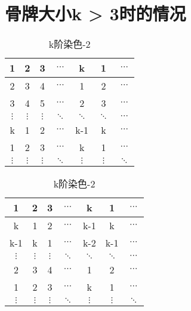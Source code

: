 \section{骨牌大小k > 3时的情况}

\begin{table}[htbp]
	\caption{k阶染色}
	\label{fig:k-order-staining}
	\begin{subtable}{.5\linewidth}
		\centering
		\caption{k阶染色-1}
		\begin{tabular}{|c|c|c|c|c|c|c|}
			\hline
			1        & 2        & 3        & $\cdots$ & k        & 1        & $\cdots$ \\
			\hline
			2        & 3        & 4        & $\cdots$ & 1        & 2        & $\cdots$ \\
			\hline
			3        & 4        & 5        & $\cdots$ & 2        & 3        & $\cdots$ \\
			\hline
			$\vdots$ & $\vdots$ & $\vdots$ & $\ddots$ & $\ddots$ & $\ddots$ & $\cdots$ \\
			\hline
			k        & 1        & 2        & $\cdots$ & k-1      & k        & $\cdots$ \\
			\hline
			1        & 2        & 3        & $\cdots$ & k        & 1        & $\cdots$ \\
			\hline
			$\vdots$ & $\vdots$ & $\vdots$ & $\ddots$ & $\vdots$ & $\vdots$ & $\ddots$ \\
			\hline
		\end{tabular}
		\label{fig:k-order-staining-1}
	\end{subtable}%
	\begin{subtable}{.5\linewidth}
		\centering
		\caption{k阶染色-2}
		\begin{tabular}{|c|c|c|c|c|c|c|}
			\hline
			1        & 2        & 3        & $\cdots$ & k        & 1        & $\cdots$ \\
			\hline
			k        & 1        & 2        & $\cdots$ & k-1      & k        & $\cdots$ \\
			\hline
			k-1      & k        & 1        & $\cdots$ & k-2      & k-1      & $\cdots$ \\
			\hline
			$\vdots$ & $\vdots$ & $\vdots$ & $\ddots$ & $\ddots$ & $\ddots$ & $\cdots$ \\
			\hline
			2        & 3        & 4        & $\cdots$ & 1        & 2        & $\cdots$ \\
			\hline
			1        & 2        & 3        & $\cdots$ & k        & 1        & $\cdots$ \\
			\hline
			$\vdots$ & $\vdots$ & $\vdots$ & $\ddots$ & $\vdots$ & $\vdots$ & $\ddots$ \\
			\hline
		\end{tabular}
		\label{fig:k-order-staining-2}
	\end{subtable}
\end{table}


